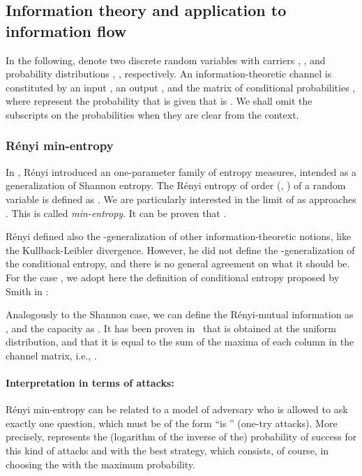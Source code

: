 \documentclass{llncs}
\begin{document}
\subsection{Information theory and application to information flow}

In the following,  denote two discrete random variables with carriers
, , and
probability distributions ,  , respectively. An information-theoretic channel is constituted by an input , an output , and the matrix of conditional probabilities , where  represent the probability that  is  given that  is . We shall omit the subscripts on the probabilities when they are clear from the context. 
 

 \subsubsection{R\'enyi min-entropy}
	
	In \cite{Renyi:61:Berkeley}, R\'enyi introduced an one-parameter family of entropy measures,  intended as a generalization of Shannon entropy. The R\'enyi entropy of order  (,  ) of  a random variable  is defined as . We are particularly interested in the limit of  as  approaches . This is  called \emph{min-entropy}. It can be proven  that .
	
	R\'enyi defined also the -generalization of other information-theoretic notions, like the Kullback-Leibler divergence. However, he did not define the -generalization of the  conditional entropy, and there is no general agreement on what it should be. For the case , we adopt here the definition of conditional entropy proposed by Smith in \cite{Smith:09:FOSSACS}:

	
	
	Analogously  to the Shannon case, we can define the R\'enyi-mutual information  as , and the capacity  as . It has been proven in~\cite{Braun:09:MFPS} that  is obtained at the uniform distribution, and that it is equal to the sum of the maxima of each column in the channel matrix, i.e., .

\paragraph{Interpretation in terms of attacks:}
R\'enyi min-entropy can be related to a model of  adversary who is allowed to ask exactly one question, which must be of the form ``is '' (one-try attacks). More precisely,  represents the (logarithm of the inverse of the) probability of success for this kind of attacks and with  the best strategy, which consists, of course, in choosing the  with the maximum probability. 
\end{document}
